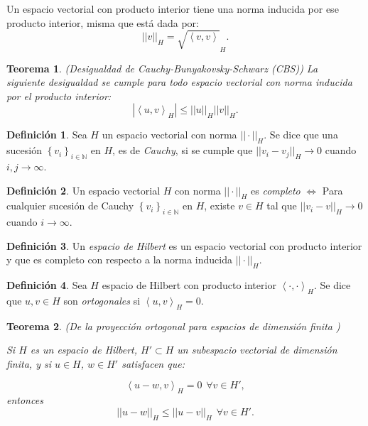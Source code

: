 \documentclass[12pt,spanish,oneside]{book}
\theoremstyle{plain}
\newtheorem{teo}{Teorema}[chapter]
\numberwithin{equation}{chapter}
\theoremstyle{definition}
\newtheorem{defi}{Definici\'{o}n}[chapter]
\theoremstyle{remark}
\newcommand{\nat}{\mathbb{N}}
\begin{document}
Un espacio vectorial con producto interior tiene una norma inducida por ese producto interior, misma que está dada por: 
\[||v||_H=\sqrt{\left<v,v\right>}_H.\]

\begin{teo}{(Desigualdad de Cauchy-Bunyakovsky-Schwarz (CBS))}
La \\siguiente desigualdad se cumple para todo espacio vectorial con norma inducida por el producto interior:
\[| \left<u,v\right>_H |\leq ||u||_H ||v||_H.\]
\end{teo}

\begin{defi}
Sea $H$ un espacio vectorial con norma $||\cdot||_H$. Se dice que una sucesión $\left \lbrace v_i \right \rbrace_{i\in \nat}$ en $ H $, es de \textit{Cauchy}, si se cumple que $||v_i-v_j||_H \rightarrow 0 $ cuando $i,j\rightarrow \infty$.
\end{defi}

\begin{defi}
Un espacio vectorial $H$ con norma $||\cdot||_H$ es \textit{completo} $\iff$ Para cualquier sucesión de Cauchy $\left \lbrace v_i \right \rbrace_{i\in \nat}$ en $ H $, existe $v\in H$ tal que $||v_i-v||_H\rightarrow 0$ cuando $i \rightarrow \infty$. 
\end{defi}
\begin{defi}
Un \textit{espacio de Hilbert} es un espacio vectorial con producto interior y que es completo con respecto a la norma inducida $||\cdot||_H$.

\end{defi}

\begin{defi}

Sea $H$ espacio de Hilbert con producto interior $\left<\cdot,\cdot\right>_H$. Se dice que $u,v\in H$ son \textit{ortogonales} si $\left<u,v\right>_H=0$.

\end{defi}

\begin{teo}{(De la proyección ortogonal para espacios de dimensión finita )}

Si $H$ es un espacio de Hilbert, $ H'\subset H$ un subespacio vectorial de dimensión finita, y si $u\in H$, $w\in H'$ satisfacen que:

\[\left<u - w,v\right>_H=0\hspace{5pt}\forall v\in H',\]
entonces 
\[||u- w||_H\leq ||u-v||_H \hspace{5pt} \forall v \in H'.\]
\end{teo}
\end{document}
